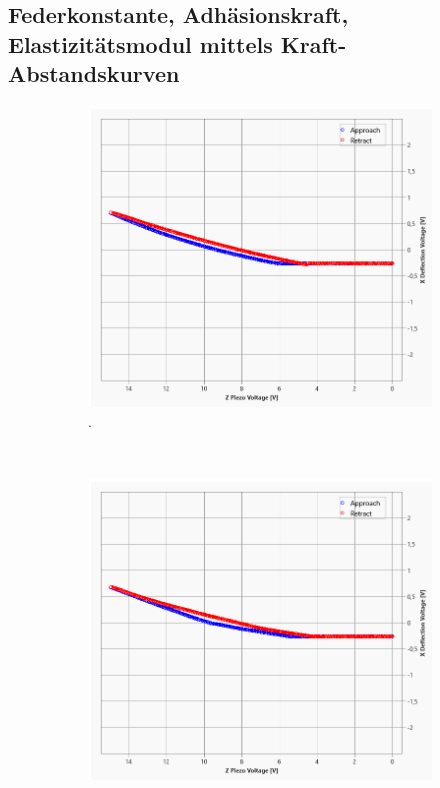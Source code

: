 \subsection{Federkonstante, Adhäsionskraft, Elastizitätsmodul mittels Kraft-Abstandskurven}

\begin{figure}[H]
\centering
	\begin{subfigure}[t]{0.3\textwidth}
	\includegraphics[width=\textwidth]{AFM_auswertung/edelstahl_kurve.png}
	\caption{.}
	\label{abb:}
	\end{subfigure}
	\\
	\begin{subfigure}[t]{0.3\textwidth}
	\includegraphics[width=\textwidth]{AFM_auswertung/teflon_kurve.png}

\end{subfigure}
\end{figure}
